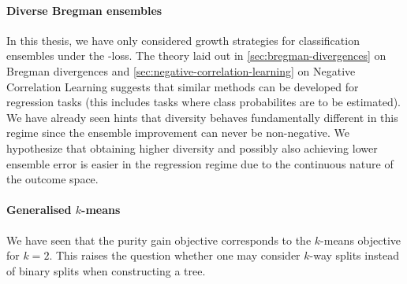 \documentclass[
	twoside=false, %
]{kaobook}
\begin{document}
\paragraph{Diverse Bregman ensembles} In this thesis, we have only considered growth strategies for classification ensembles under the \zeroone-loss. The theory laid out in \cref{sec:bregman-divergences} on Bregman divergences and \cref{sec:negative-correlation-learning} on Negative Correlation Learning suggests that similar methods can be developed for regression tasks (this includes tasks where class probabilites are to be estimated). We have already seen hints that diversity behaves fundamentally different in this regime since the ensemble improvement can never be non-negative. We hypothesize that obtaining higher diversity and possibly also achieving lower ensemble error is easier in the regression regime due to the continuous nature of the outcome space. 

\paragraph{Generalised $k$-means} We have seen that the purity gain objective corresponds to the $k$-means objective for $k=2$. This raises the question whether one may consider $k$-way splits instead of binary splits when constructing a tree.



\backmatter %



\printbibliography[heading=bibintoc, title=Bibliography] %



\end{document}
